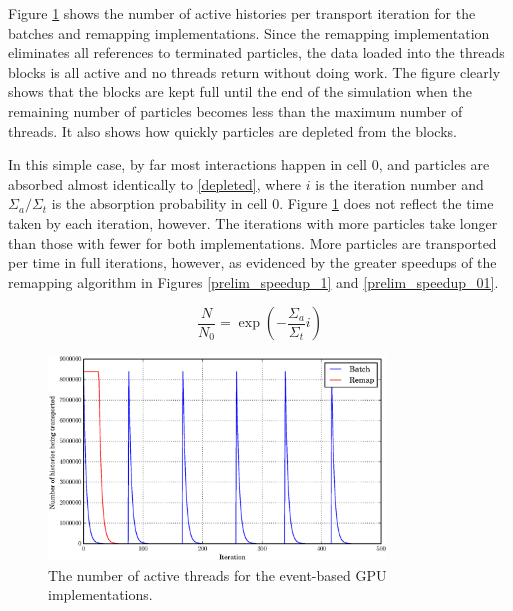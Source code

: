 Figure \ref{prelim_active} shows the number of active histories per transport iteration for the batches and remapping implementations.  Since the remapping implementation eliminates all references to terminated particles, the data loaded into the threads blocks is all active and no threads return without doing work.  The figure clearly shows that the blocks are kept full until the end of the simulation when the remaining number of particles becomes less than the maximum number of threads.  It also shows how quickly particles are depleted from the blocks.  

In this simple case, by far most interactions happen in cell 0, and particles are absorbed almost identically to \eqref{depleted}, where $i$ is the iteration number and $\Sigma_a/\Sigma_t$ is the absorption probability in cell 0. %
  Figure \ref{prelim_active} does not reflect the time taken by each iteration, however.  The iterations with more particles take longer than those with fewer for both implementations.  More particles are transported per time in full iterations, however, as evidenced by the greater speedups of the remapping algorithm in Figures \ref{prelim_speedup_1} and \ref{prelim_speedup_01}.%

\begin{equation}
\label{depleted}
\frac{N}{N_0}=\exp \left(-\frac{\Sigma_a}{\Sigma_t} i \right)
\end{equation}

\begin{figure}[h!] 
  \centering
    \includegraphics[width=0.8\textwidth]{graphics/prelim_active.eps}
     \caption{The number of active threads for the event-based GPU implementations. \label{prelim_active} }
\end{figure}


